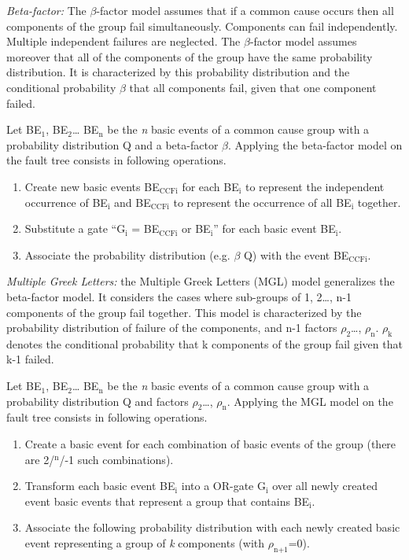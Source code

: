 \documentclass[11pt]{article}
\begin{document}
\emph{Beta-factor:} The \(\beta\)-factor model assumes that if a common cause occurs
then all components of the group fail simultaneously. Components can
fail independently. Multiple independent failures are neglected. The
\(\beta\)-factor model assumes moreover that all of the components of the group
have the same probability distribution. It is characterized by this
probability distribution and the conditional probability \(\beta\) that all
components fail, given that one component failed.

Let BE\(_{\text{1}}\), BE\(_{\text{2}}\)\ldots{} BE\(_{\text{n}}\) be the \emph{n} basic events of a common cause
group with a probability distribution Q and a beta-factor \(\beta\). Applying
the beta-factor model on the fault tree consists in following
operations.

\begin{enumerate}
\item Create new basic events BE\(_{\text{CCFi}}\) for each BE\(_{\text{i}}\) to represent the
independent occurrence of BE\(_{\text{i}}\) and BE\(_{\text{CCFi}}\) to represent the
occurrence of all BE\(_{\text{i}}\) together.

\item Substitute a gate ``G\(_{\text{i}}\) = BE\(_{\text{CCFi}}\) or BE\(_{\text{i}}\)'' for each basic event
BE\(_{\text{i}}\).

\item Associate the probability distribution (e.g. \(\beta\)\texttimes{} Q) with the event
BE\(_{\text{CCFi}}\).
\end{enumerate}

\emph{Multiple Greek Letters:} the Multiple Greek Letters (MGL) model
generalizes the beta-factor model. It considers the cases where
sub-groups of 1, 2\ldots{}, n-1 components of the group fail together. This
model is characterized by the probability distribution of failure of the
components, and n-1 factors \(\rho_{\text{2}}\)\ldots{}, \(\rho_{\text{n}}\). \(\rho_{\text{k}}\) denotes the
conditional probability that k components of the group fail given that
k-1 failed.

Let BE\(_{\text{1}}\), BE\(_{\text{2}}\)\ldots{} BE\(_{\text{n}}\) be the \emph{n} basic events of a common cause
group with a probability distribution Q and factors \(\rho_{\text{2}}\)\ldots{}, \(\rho_{\text{n}}\).
Applying the MGL model on the fault tree consists in following
operations.

\begin{enumerate}
\item Create a basic event for each combination of basic events of the
group (there are 2/\(^{\text{n}}\)/-1 such combinations).

\item Transform each basic event BE\(_{\text{i}}\) into a OR-gate G\(_{\text{i}}\) over all newly
created event basic events that represent a group that contains
BE\(_{\text{i}}\).

\item Associate the following probability distribution with each newly
created basic event representing a group of \emph{k} components (with
\(\rho_{\text{n+1}}\)=0).
\end{enumerate}
\end{document}
